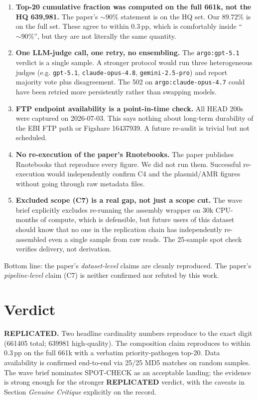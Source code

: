 \documentclass[11pt]{article}
\begin{document}
\begin{enumerate}
\item \textbf{Top-20 cumulative fraction was computed on the full 661k, not the HQ 639,981.}
The paper's $\sim 90\%$ statement is on the HQ set. Our $89.72\%$ is on the full set. These
agree to within $0.3$\,pp, which is comfortably inside ``$\sim 90\%$'', but they are not
literally the same quantity.

\item \textbf{One LLM-judge call, one retry, no ensembling.} The \texttt{argo:gpt-5.1}
verdict is a single sample. A stronger protocol would run three heterogeneous judges (e.g.
\texttt{gpt-5.1}, \texttt{claude-opus-4.8}, \texttt{gemini-2.5-pro}) and report majority vote
plus disagreement. The 502 on \texttt{argo:claude-opus-4.7} could have been retried more
persistently rather than swapping models.

\item \textbf{FTP endpoint availability is a point-in-time check.} All HEAD 200s were captured
on 2026-07-03. This says nothing about long-term durability of the EBI FTP path or Figshare
16437939. A future re-audit is trivial but not scheduled.

\item \textbf{No re-execution of the paper's Rnotebooks.} The paper publishes Rnotebooks that
reproduce every figure. We did not run them. Successful re-execution would independently
confirm C4 and the plasmid/AMR figures without going through raw metadata files.

\item \textbf{Excluded scope (C7) is a real gap, not just a scope cut.} The wave brief
explicitly excludes re-running the assembly wrapper on 30k CPU-months of compute, which is
defensible, but future users of this dataset should know that no one in the replication chain
has independently re-assembled even a single sample from raw reads. The 25-sample spot check
verifies delivery, not derivation.
\end{enumerate}

Bottom line: the paper's \emph{dataset-level} claims are cleanly reproduced. The paper's
\emph{pipeline-level} claim (C7) is neither confirmed nor refuted by this work.

\section{Verdict}

\textbf{REPLICATED.} Two headline cardinality numbers reproduce to the exact digit
(\num{661405} total; \num{639981} high-quality). The composition claim reproduces to within
$0.3$\,pp on the full 661k with a verbatim priority-pathogen top-20. Data availability is
confirmed end-to-end via 25/25 MD5 matches on random samples. The wave brief nominates
SPOT-CHECK as an acceptable landing; the evidence is strong enough for the stronger
\textbf{REPLICATED} verdict, with the caveats in Section \emph{Genuine Critique} explicitly on
the record.
\end{document}
